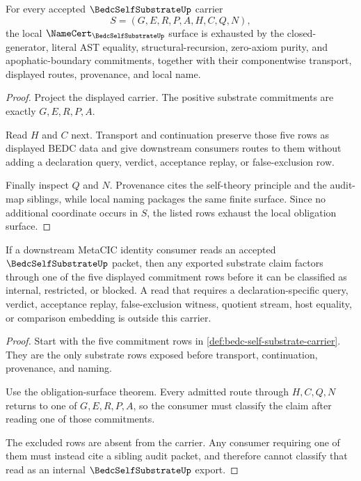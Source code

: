 \begin{theorem}
\label{thm:bedc-self-theory-obligation-surface}
For every accepted $\BedcSelfSubstrateUp$ carrier
$$
S=(G,E,R,P,A,H,C,Q,N),
$$
the local $\NameCert_{\BedcSelfSubstrateUp}$ surface is exhausted by the closed-generator, literal AST equality, structural-recursion, zero-axiom purity, and apophatic-boundary commitments, together with their componentwise transport, displayed routes, provenance, and local name.
\end{theorem}
\begin{proof}
Project the displayed carrier. The positive substrate commitments are exactly $G,E,R,P,A$.

Read $H$ and $C$ next. Transport and continuation preserve those five rows as displayed BEDC data and give downstream consumers routes to them without adding a declaration query, verdict, acceptance replay, or false-exclusion row.

Finally inspect $Q$ and $N$. Provenance cites the self-theory principle and the audit-map siblings, while local naming packages the same finite surface. Since no additional coordinate occurs in $S$, the listed rows exhaust the local obligation surface.
\end{proof}

\begin{theorem}
\label{thm:bedc-self-theory-falsifiable-boundary}
If a downstream MetaCIC identity consumer reads an accepted $\BedcSelfSubstrateUp$ packet, then any exported substrate claim factors through one of the five displayed commitment rows before it can be classified as internal, restricted, or blocked. A read that requires a declaration-specific query, verdict, acceptance replay, false-exclusion witness, quotient stream, host equality, or comparison embedding is outside this carrier.
\end{theorem}
\begin{proof}
Start with the five commitment rows in \autoref{def:bedc-self-substrate-carrier}. They are the only substrate rows exposed before transport, continuation, provenance, and naming.

Use the obligation-surface theorem. Every admitted route through $H,C,Q,N$ returns to one of $G,E,R,P,A$, so the consumer must classify the claim after reading one of those commitments.

The excluded rows are absent from the carrier. Any consumer requiring one of them must instead cite a sibling audit packet, and therefore cannot classify that read as an internal $\BedcSelfSubstrateUp$ export.
\end{proof}

